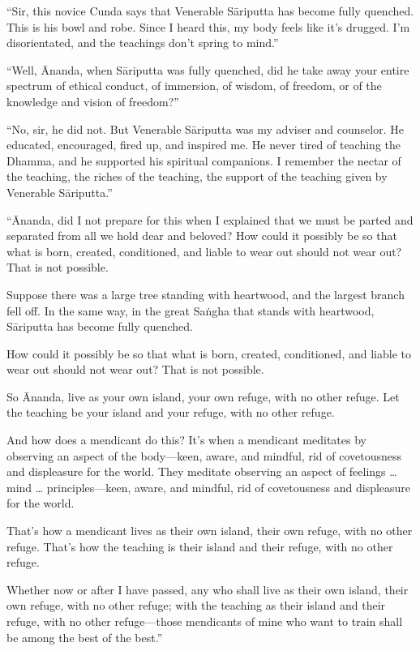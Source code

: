 \documentclass[12pt,openany]{book}%
\begin{document}
“Sir, this novice Cunda says that Venerable \textsanskrit{Sāriputta} has become fully quenched. This is his bowl and robe. Since I heard this, my body feels like it’s drugged. I’m disorientated, and the teachings don’t spring to mind.” 

“Well, Ānanda, when \textsanskrit{Sāriputta} was fully quenched, did he take away your entire spectrum of ethical conduct, of immersion, of wisdom, of freedom, or of the knowledge and vision of freedom?” 

“No, sir, he did not. But Venerable \textsanskrit{Sāriputta} was my adviser and counselor. He educated, encouraged, fired up, and inspired me. He never tired of teaching the Dhamma, and he supported his spiritual companions. I remember the nectar of the teaching, the riches of the teaching, the support of the teaching given by Venerable \textsanskrit{Sāriputta}.” 

“Ānanda, did I not prepare for this when I explained that we must be parted and separated from all we hold dear and beloved? How could it possibly be so that what is born, created, conditioned, and liable to wear out should not wear out? That is not possible. 

Suppose there was a large tree standing with heartwood, and the largest branch fell off. In the same way, in the great \textsanskrit{Saṅgha} that stands with heartwood, \textsanskrit{Sāriputta} has become fully quenched. 

How could it possibly be so that what is born, created, conditioned, and liable to wear out should not wear out? That is not possible. 

So Ānanda, live as your own island, your own refuge, with no other refuge. Let the teaching be your island and your refuge, with no other refuge. 

And how does a mendicant do this? It’s when a mendicant meditates by observing an aspect of the body—keen, aware, and mindful, rid of covetousness and displeasure for the world. They meditate observing an aspect of feelings … mind … principles—keen, aware, and mindful, rid of covetousness and displeasure for the world. 

That’s how a mendicant lives as their own island, their own refuge, with no other refuge. That’s how the teaching is their island and their refuge, with no other refuge. 

Whether now or after I have passed, any who shall live as their own island, their own refuge, with no other refuge; with the teaching as their island and their refuge, with no other refuge—those mendicants of mine who want to train shall be among the best of the best.” 
\end{document}
